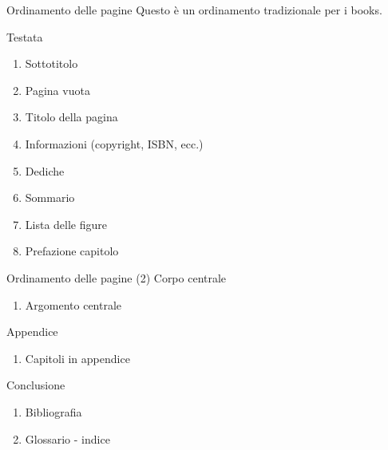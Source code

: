 \begin{frame}{Ordinamento delle pagine}
Questo \`e un ordinamento tradizionale per i books.

Testata
\begin{enumerate}
    \item Sottotitolo
    \item Pagina vuota
    \item Titolo della pagina
    \item Informazioni (copyright, ISBN, ecc.)
    \item Dediche
    \item Sommario
    \item Lista delle figure
    \item Prefazione capitolo
\end{enumerate}
\end{frame}

\begin{frame}{Ordinamento delle pagine (2)}
Corpo centrale
\begin{enumerate}
    \item Argomento centrale
\end{enumerate}
    
Appendice
\begin{enumerate}
    \item Capitoli in appendice
\end{enumerate}

Conclusione
\begin{enumerate}
    \item Bibliografia
    \item Glossario - indice
\end{enumerate}
\end{frame}
    